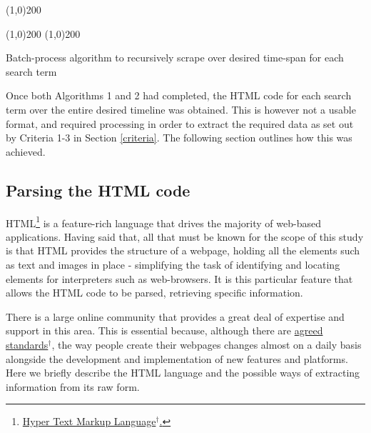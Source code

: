 \documentclass{article}
\begin{document}
\vspace{7mm}

\linethickness{0.35mm}
\line(1,0){200}\newline
\begin{algorithm}[H]
  \vspace{-2mm}
  \linethickness{0.3mm}
  \line(1,0){200}\newline
  \vspace{-1.5mm}
  \linethickness{0.35mm}
  \line(1,0){200}\newline
  \caption{Batch-process algorithm to recursively scrape over desired time-span for each search term}
\end{algorithm}

\vspace{7mm}

Once both Algorithms 1 and 2 had completed, the HTML code for each search term over the entire desired timeline was obtained. This is however not a usable format, and required processing in order to extract the required data as set out by Criteria 1-3 in Section \ref{criteria}.
The following section outlines how this was achieved.


\subsection{Parsing the HTML code}
\label{sec-3-4}

HTML\footnote{\href{https://en.wikipedia.org/wiki/HTML}{Hyper Text Markup Language$^{\dag{}}$.}} is a feature-rich language that drives the majority of web-based applications. Having said that, all that must be known for the scope of this study is that HTML provides the structure of a webpage, holding all the elements such as text and images in place - simplifying the task of identifying and locating elements for interpreters such as web-browsers. It is this particular feature that allows the HTML code to be parsed, retrieving specific information.

There is a large online community that provides a great deal of expertise and support in this area. This is essential because, although there are \href{http://www.w3.org/TR/html51/}{agreed standards$^{\dag{}}$}, the way people create their webpages changes almost on a daily basis alongside the development and implementation of new features and platforms. Here we briefly describe the HTML language and the possible ways of extracting information from its raw form.
\end{document}

